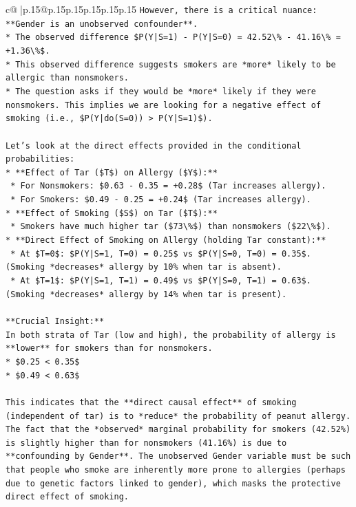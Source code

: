 \documentclass{article}
\begin{document}
{\begin{supertabular}{c@{$\;$}|p{.15\linewidth}@{}p{.15\linewidth}p{.15\linewidth}p{.15\linewidth}p{.15\linewidth}p{.15\linewidth}}
{{{\texttt{However, there is a critical nuance: **Gender is an unobserved confounder**.} \\
\texttt{*   The observed difference \$P(Y|S=1) {-} P(Y|S=0) = 42.52\textbackslash{}\% {-} 41.16\textbackslash{}\% = +1.36\textbackslash{}\%\$.} \\
\texttt{*   This observed difference suggests smokers are *more* likely to be allergic than nonsmokers.} \\
\texttt{*   The question asks if they would be *more* likely if they were nonsmokers. This implies we are looking for a negative effect of smoking (i.e., \$P(Y|do(S=0)) > P(Y|S=1)\$).} \\
\\ 
\texttt{Let's look at the direct effects provided in the conditional probabilities:} \\
\texttt{*   **Effect of Tar (\$T\$) on Allergy (\$Y\$):**} \\
\texttt{    *   For Nonsmokers: \$0.63 {-} 0.35 = +0.28\$ (Tar increases allergy).} \\
\texttt{    *   For Smokers: \$0.49 {-} 0.25 = +0.24\$ (Tar increases allergy).} \\
\texttt{*   **Effect of Smoking (\$S\$) on Tar (\$T\$):**} \\
\texttt{    *   Smokers have much higher tar (\$73\textbackslash{}\%\$) than nonsmokers (\$22\textbackslash{}\%\$).} \\
\texttt{*   **Direct Effect of Smoking on Allergy (holding Tar constant):**} \\
\texttt{    *   At \$T=0\$: \$P(Y|S=1, T=0) = 0.25\$ vs \$P(Y|S=0, T=0) = 0.35\$. (Smoking *decreases* allergy by 10\% when tar is absent).} \\
\texttt{    *   At \$T=1\$: \$P(Y|S=1, T=1) = 0.49\$ vs \$P(Y|S=0, T=1) = 0.63\$. (Smoking *decreases* allergy by 14\% when tar is present).} \\
\\ 
\texttt{**Crucial Insight:**} \\
\texttt{In both strata of Tar (low and high), the probability of allergy is **lower** for smokers than for nonsmokers.} \\
\texttt{*   \$0.25 < 0.35\$} \\
\texttt{*   \$0.49 < 0.63\$} \\
\\ 
\texttt{This indicates that the **direct causal effect** of smoking (independent of tar) is to *reduce* the probability of peanut allergy. The fact that the *observed* marginal probability for smokers (42.52\%) is slightly higher than for nonsmokers (41.16\%) is due to **confounding by Gender**. The unobserved Gender variable must be such that people who smoke are inherently more prone to allergies (perhaps due to genetic factors linked to gender), which masks the protective direct effect of smoking.} \\
}}}
\end{supertabular}}
\end{document}
